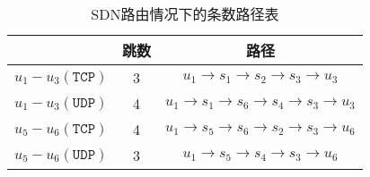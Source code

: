 
\begin{table}[h]
  \centering
  \begin{tabular}{ccc}
    \toprule
    & 跳数 & 路径 \\
    \midrule
    $ u_1 - u_3(\texttt{TCP}) $ & 3 & $ u_1 \rightarrow s_1 \rightarrow s_2 \rightarrow s_3 \rightarrow u_3 $ \\
    $ u_1 - u_3(\texttt{UDP}) $ & 4 & $ u_1 \rightarrow s_1 \rightarrow s_6 \rightarrow s_4 \rightarrow s_3 \rightarrow u_3 $ \\
    $ u_5 - u_6(\texttt{TCP}) $ & 4 & $ u_1 \rightarrow s_5 \rightarrow s_6 \rightarrow s_2 \rightarrow s_3 \rightarrow u_6 $ \\
    $ u_5 - u_6(\texttt{UDP}) $ & 3 & $ u_1 \rightarrow s_5 \rightarrow s_4 \rightarrow s_3 \rightarrow u_6 $ \\
    \bottomrule
  \end{tabular}
  \caption{SDN路由情况下的条数路径表}
\end{table}